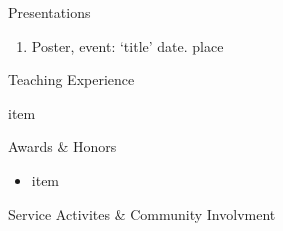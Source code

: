 \documentclass{resume} %
\begin{document}
\begin{rSection}{Presentations}

\begin{enumerate}[leftmargin = 0 pt]
\item Poster, event: `title' date. place

\end{enumerate}

\end{rSection}


\begin{rSection}{Teaching Experience}
	
\begin{rSubsection}{}{}{}{}
\item item
\end{rSubsection}



\end{rSection}





\begin{rSection}{Awards \& Honors}

\begin{itemize}[leftmargin = 0 pt]
	\item item
\end{itemize}


\end{rSection}


\begin{rSection}{Service Activites \& Community Involvment}



\end{rSection}
\end{document}
